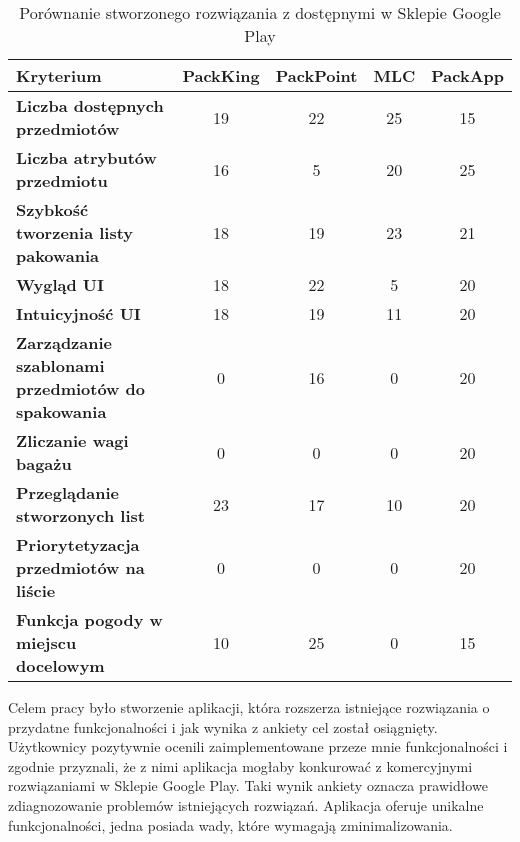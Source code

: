\documentclass[a4paper,12pt]{article}
\begin{document}
\begin{table}[H]
    \centering
    \caption{Porównanie stworzonego rozwiązania z dostępnymi w Sklepie Google Play}
    \begin{tabularx}{\textwidth}{|X|c|c|c|c|}
        \hline
        \textbf{Kryterium} & \textbf{PackKing} & \textbf{PackPoint} & \textbf{MLC} & \textbf{PackApp}\\ 
        \hline
        \textbf{Liczba dostępnych przedmiotów} & 19 & 22 & 25 & 15 \\
				\hline
        \textbf{Liczba atrybutów przedmiotu} & 16 & 5 & 20 & 25 \\
        \hline
        \textbf{Szybkość tworzenia \newline listy pakowania} & 18 & 19 & 23 & 21 \\
        \hline
        \textbf{Wygląd UI} & 18 & 22 & 5 & 20 \\
        \hline        
        \textbf{Intuicyjność UI} & 18 & 19 & 11 & 20 \\
        \hline        
        \textbf{Zarządzanie szablonami \newline przedmiotów do spakowania} & 0 & 16 & 0 & 20 \\
        \hline        
        \textbf{Zliczanie wagi bagażu} & 0 & 0 & 0 & 20 \\
				\hline        
        \textbf{Przeglądanie stworzonych list} & 23 & 17 & 10 & 20 \\
				\hline        
        \textbf{Priorytetyzacja przedmiotów \newline na liście} & 0 & 0 & 0 & 20 \\
				\hline
        \textbf{Funkcja pogody w \newline miejscu docelowym} & 10 & 25 & 0 & 15 \\
        \hline        
    \end{tabularx}
    \label{tab:opinion-table}
\end{table}

Celem pracy było stworzenie aplikacji, która rozszerza istniejące rozwiązania o przydatne funkcjonalności i jak wynika z ankiety cel został osiągnięty. Użytkownicy pozytywnie ocenili zaimplementowane przeze mnie funkcjonalności i zgodnie przyznali, że z nimi aplikacja mogłaby konkurować z komercyjnymi rozwiązaniami w Sklepie Google Play. Taki wynik ankiety oznacza prawidłowe zdiagnozowanie problemów istniejących rozwiązań. Aplikacja oferuje unikalne funkcjonalności, jedna posiada wady, które wymagają zminimalizowania.
\end{document}
